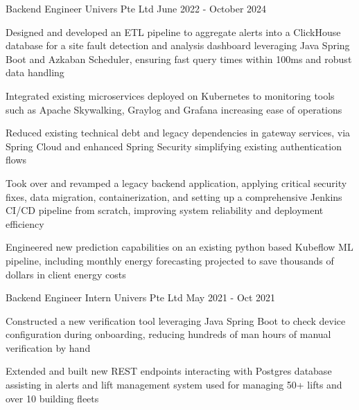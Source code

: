 \begin{cventries}
  \cventry
    {Backend Engineer} %
    {Univers Pte Ltd} %
    {} %
    {June 2022 - October 2024} %
    {
      \begin{cvitems} %
        \item {Designed and developed an ETL pipeline to aggregate alerts into a ClickHouse database for a site fault detection and analysis dashboard leveraging Java Spring Boot and Azkaban Scheduler, ensuring fast query times within 100ms and robust data handling}
        \item {Integrated existing microservices deployed on Kubernetes to monitoring tools such as Apache Skywalking, Graylog and Grafana increasing ease of operations}
        \item {Reduced existing technical debt and legacy dependencies in gateway services, via Spring Cloud and enhanced Spring Security simplifying existing authentication flows}
        \item {Took over and revamped a legacy backend application, applying critical security fixes, data migration, containerization, and setting up a comprehensive Jenkins CI/CD pipeline from scratch, improving system reliability and deployment efficiency}
        \item {Engineered new prediction capabilities on an existing python based Kubeflow ML pipeline, including monthly energy forecasting projected to save thousands of dollars in client energy costs}
      \end{cvitems}
      \vspace{4mm}
    }

  \cventry
    {Backend Engineer Intern} %
    {Univers Pte Ltd} %
    {} %
    {May 2021 - Oct 2021} %
    {
      \begin{cvitems} %
        \item {Constructed a new verification tool leveraging Java Spring Boot to check device configuration during onboarding, reducing hundreds of man hours of manual verification by hand}
        \item {Extended and built new REST endpoints interacting with Postgres database assisting in alerts and lift management system used for managing 50+ lifts and over 10 building fleets}
      \end{cvitems}
      \vspace{4mm}
    }


\end{cventries}
